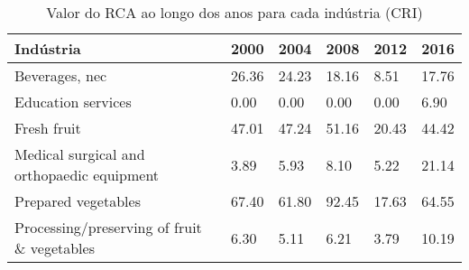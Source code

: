 \begin{table}
\centering
\caption{Valor do RCA ao longo dos anos para cada indústria (CRI)}
\begin{tabular}{p{6cm}p{1.5cm}p{1.5cm}p{1.5cm}p{1.5cm}p{1.5cm}}
\toprule
                                  Indústria &  2000 &  2004 &  2008 &  2012 &  2016 \\
\midrule
                             Beverages, nec & 26.36 & 24.23 & 18.16 &  8.51 & 17.76 \\
                         Education services &  0.00 &  0.00 &  0.00 &  0.00 &  6.90 \\
                                Fresh fruit & 47.01 & 47.24 & 51.16 & 20.43 & 44.42 \\
 Medical surgical and orthopaedic equipment &  3.89 &  5.93 &  8.10 &  5.22 & 21.14 \\
                        Prepared vegetables & 67.40 & 61.80 & 92.45 & 17.63 & 64.55 \\
Processing/preserving of fruit \& vegetables &  6.30 &  5.11 &  6.21 &  3.79 & 10.19 \\
\bottomrule
\end{tabular}
\end{table}
